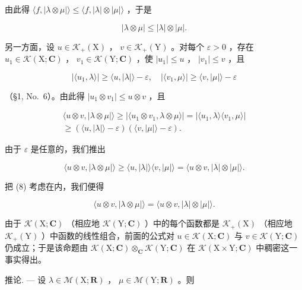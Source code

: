 由此得 \(\langle f, |\lambda \otimes \mu| \rangle \leqslant \langle f, |\lambda| \otimes |\mu| \rangle\) ，于是

\[
| \lambda \otimes \mu | \leqslant | \lambda | \otimes | \mu |.\tag{8}
\]

另一方面，设 \(u \in \mathcal{K}_{+}(\mathrm{X})\) ， \(v \in \mathcal{K}_{+}(\mathrm{Y})\) 。对每个 \(\varepsilon > 0\) ，存在 \(u_{1} \in \mathcal{K}(\mathrm{X};\mathbf{C})\) ， \(v_{1} \in \mathcal{K}(\mathrm{Y};\mathbf{C})\) ，使 \(|u_{1}| \leqslant u\) ， \(|v_{1}| \leqslant v\) ，且

\[
| \langle u _ {1}, \lambda \rangle | \geqslant \langle u, | \lambda | \rangle - \varepsilon , \quad | \langle v _ {1}, \mu \rangle | \geqslant \langle v, | \mu | \rangle - \varepsilon
\]

（§1, No.~6）。由此得 \(|u_1 \otimes v_1| \leqslant u \otimes v\) ，且

\[
\begin{array}{c} \langle u \otimes v, | \lambda \otimes \mu | \rangle \geqslant | \langle u _ {1} \otimes v _ {1}, \lambda \otimes \mu \rangle | = | \langle u _ {1}, \lambda \rangle \langle v _ {1}, \mu \rangle | \\ \geqslant (\langle u, | \lambda | \rangle - \varepsilon) (\langle v, | \mu | \rangle - \varepsilon). \end{array}
\]

由于 \(\varepsilon\) 是任意的，我们推出

\[
\langle u \otimes v, | \lambda \otimes \mu | \rangle \geqslant \langle u, | \lambda | \rangle \langle v, | \mu | \rangle = \langle u \otimes v, | \lambda | \otimes | \mu | \rangle .
\]

把 (8) 考虑在内，我们便得

\[
\langle u \otimes v, | \lambda \otimes \mu | \rangle = \langle u \otimes v, | \lambda | \otimes | \mu | \rangle .
\]

由于 \(\mathcal{K}(\mathrm{X};\mathbf{C})\) （相应地 \(\mathcal{K}(\mathrm{Y};\mathbf{C})\) ）中的每个函数都是 \(\mathcal{K}_{+}(\mathrm{X})\) （相应地 \(\mathcal{K}_{+}(\mathrm{Y})\) ）中函数的线性组合，前面的公式对 \(u\in\mathcal{K}(\mathrm{X};\mathbf{C})\) 与 \(v\in\mathcal{K}(\mathrm{Y};\mathbf{C})\) 仍成立；于是该命题由 \(\mathcal{K}(\mathrm{X};\mathbf{C})\otimes_{\mathbf{C}}\mathcal{K}(\mathrm{Y};\mathbf{C})\) 在 \(\mathcal{K}(\mathrm{X}\times\mathrm{Y};\mathbf{C})\) 中稠密这一事实得出。

推论. --- 设 \(\lambda \in \mathcal{M}(\mathrm{X};\mathbf{R})\) ， \(\mu \in \mathcal{M}(\mathrm{Y};\mathbf{R})\) 。则

